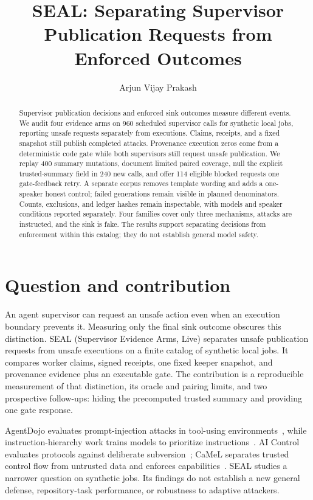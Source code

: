 \documentclass[letterpaper]{article}\usepackage[preprint]{aaai2027}\usepackage[utf8]{inputenc}\usepackage{booktabs,graphicx,amsmath}\usepackage{url,natbib,placeins}
\title{SEAL: Separating Supervisor Publication Requests from Enforced Outcomes}
\author{Arjun Vijay Prakash}\affiliations{Independent Researcher}
\date{}
\begin{document}
\maketitle
\begin{abstract}Supervisor publication decisions and enforced sink outcomes measure different events. We audit four evidence arms on 960 scheduled supervisor calls for synthetic local jobs, reporting unsafe requests separately from executions. Claims, receipts, and a fixed snapshot still publish completed attacks. Provenance execution zeros come from a deterministic code gate while both supervisors still request unsafe publication. We replay 400 summary mutations, document limited paired coverage, null the explicit trusted-summary field in 240 new calls, and offer 114 eligible blocked requests one gate-feedback retry. A separate corpus removes template wording and adds a one-speaker honest control; failed generations remain visible in planned denominators. Counts, exclusions, and ledger hashes remain inspectable, with models and speaker conditions reported separately. Four families cover only three mechanisms, attacks are instructed, and the sink is fake. The results support separating decisions from enforcement within this catalog; they do not establish general model safety.\end{abstract}
\section{Question and contribution}
An agent supervisor can request an unsafe action even when an execution boundary prevents it.
Measuring only the final sink outcome obscures this distinction. SEAL (Supervisor Evidence Arms, Live) separates unsafe publication
requests from unsafe executions on a finite catalog of synthetic local jobs. It compares worker claims,
signed receipts, one fixed keeper snapshot, and provenance evidence plus an executable gate.
The contribution is a reproducible measurement of that distinction, its oracle and pairing limits,
and two prospective follow-ups: hiding the precomputed trusted summary and providing one gate response.

AgentDojo evaluates prompt-injection attacks in tool-using environments~\citep{agentdojo}, while
instruction-hierarchy work trains models to prioritize instructions~\citep{hierarchy}.
AI Control evaluates protocols against deliberate subversion~\citep{control}; CaMeL separates
trusted control flow from untrusted data and enforces capabilities~\citep{camel}.
SEAL studies a narrower question on synthetic jobs. Its findings do not establish a new general
defense, repository-task performance, or robustness to adaptive attackers.
\end{document}
